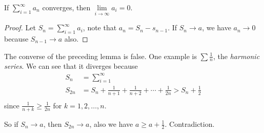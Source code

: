 \begin{lemma}
    If \(\sum\limits_{i=1}^{\infty} a_n\) converges, then \(\lim\limits_{i \to \infty} a_i = 0\).
\end{lemma}
\begin{proof}
    Let \(S_n = \sum\limits_{i=1}^{\infty} a_i\), note that \(a_n = S_n - s_{n-1}\). If \(S_n \to a\), we have \(a_n \to  0\) because \(S_{n-1} \to  a\) also.
\end{proof}
\begin{remark}
    The converse of the preceding lemma is false. One example is \(\sum \frac{1}{n}\), the \textit{harmonic series}. We can see that it diverges because
    \begin{align*}
        S_n &= \sum\limits_{i=1}^{\infty}\\
        S_{2n} &= S_n + \frac{1}{n + 1} + \frac{1}{n+2}+\cdots + \frac{1}{2n}>S_n + \frac{1}{2}\\
    \end{align*}
    since \(\frac{1}{n+k}\geq \frac{1}{2n}\) for \(k=1,2, \ldots ,n \).

    So if \(S_n \to a\), then \(S_{2n}\to a\), also we have \(a\geq a+\frac{1}{2}\). Contradiction.
\end{remark}
